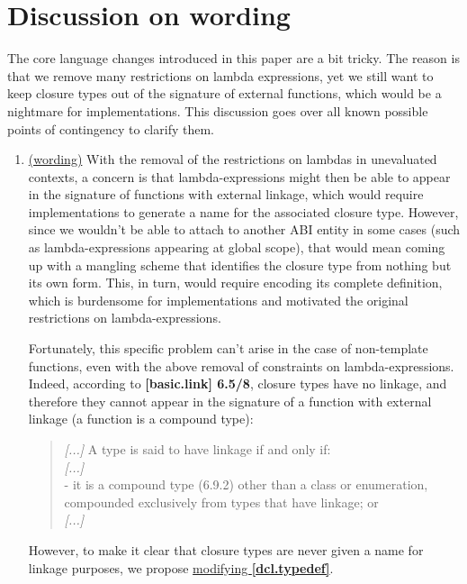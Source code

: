 \documentclass{wg21}
\begin{document}
\section{Discussion on wording}
The core language changes introduced in this paper are a bit tricky. The reason
is that we remove many restrictions on lambda expressions, yet we still want to
keep closure types out of the signature of external functions, which would be
a nightmare for implementations. This discussion goes over all known possible
points of contingency to clarify them.

\begin{enumerate}
  \item \label{discussion.non-template}
    \hyperref[wording.non-template]{(wording)}
    With the removal of the restrictions on lambdas in unevaluated contexts,
    a concern is that lambda-expressions might then be able to appear in the
    signature of functions with external linkage, which would require implementations
    to generate a name for the associated closure type. However, since we wouldn't
    be able to attach to another ABI entity in some cases (such as lambda-expressions
    appearing at global scope), that would mean coming up with a mangling scheme
    that identifies the closure type from nothing but its own form. This, in turn,
    would require encoding its complete definition, which is burdensome for
    implementations and motivated the original restrictions on lambda-expressions.

    Fortunately, this specific problem can't arise in the case of non-template
    functions, even with the above removal of constraints on lambda-expressions.
    Indeed, according to \textbf{[basic.link] 6.5/8}, closure types have no linkage,
    and therefore they cannot appear in the signature of a function with external
    linkage (a function is a compound type):
    \begin{quote}
      \textit{[...]} A type is said to have linkage if and only if:\\
      \textit{[...]}\\
      - it is a compound type (6.9.2) other than a class or enumeration,
        compounded exclusively from types that have linkage; or \\
      \textit{[...]}
    \end{quote}

    However, to make it clear that closure types are never given a name for
    linkage purposes, we propose \hyperref[wording.non-template]{modifying
    \textbf{[dcl.typedef]}}.



\end{enumerate}
\end{document}

